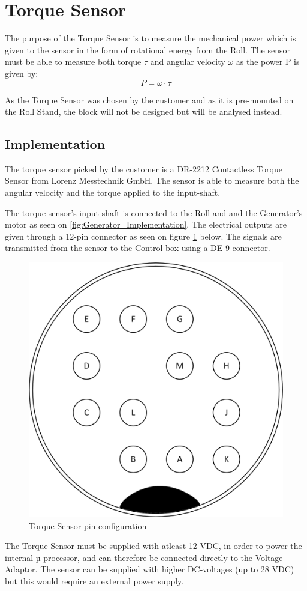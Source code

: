 \newpage
\section{Torque Sensor}
The purpose of the Torque Sensor is to measure the mechanical power which is given to the sensor in the form of rotational energy from the Roll. The sensor must be able to measure both torque $\tau$ and angular velocity $\omega$ as the power P is given by:
\begin{equation}
	P=\omega\cdot\tau
\end{equation}

As the Torque Sensor was chosen by the customer and as it is pre-mounted on the Roll Stand, the block will not be designed but will be analysed instead.

\subsection{Implementation}
The torque sensor picked by the customer is a DR-2212 Contactless Torque Sensor from Lorenz Messtechnik GmbH. The sensor is able to measure both the angular velocity and the torque applied to the input-shaft.

The torque sensor's input shaft is connected to the Roll and and the Generator's motor as seen on \vref{fig:Generator_Implementation}. The electrical outputs are given through a 12-pin connector as seen on figure \ref{fig:Torque_pins} below. The signals are transmitted from the sensor to the Control-box using a DE-9 connector.

\begin{figure}[H]
	\centering
	\includegraphics[width=0.4\linewidth]{Hardware/Pictures/Torque_Sensor_Pins}
	\caption{Torque Sensor pin configuration}
	\label{fig:Torque_pins}
\end{figure}

The Torque Sensor must be supplied with atleast 12 VDC, in order to power the internal µ-processor, and can therefore be connected directly to the Voltage Adaptor. The sensor can be supplied with higher DC-voltages (up to 28 VDC) but this would require an external power supply.

